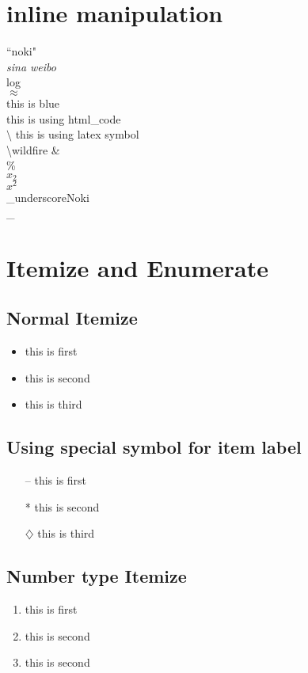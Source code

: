 \documentclass{article}
\author{Sab}
\begin{document}
\section{inline manipulation}
``noki"\\
\emph{sina weibo}\\
\mbox{log}\\
$\approx$\\
{\color{blue}this is blue}\\
{\color[HTML]{8e1a00}this is using html\_code}\\
$\setminus$ this is using latex symbol\\
\textbackslash{wildfire}
\&\\
\%\\
$x_{2}$\\
$x^{2}$\\
\_underscoreNoki\\
\_\\

\section{Itemize and Enumerate}
\label{ref:Itemize}
\subsection{Normal Itemize}
\begin{itemize}
\item this is first
\item this is second
\item this is third
\end{itemize}

\subsection{Using special symbol for item label}
\begin{itemize}
\item[--]this is first
\item[*]this is second
\item[$\diamondsuit$]this is third
\end{itemize}

\subsection{Number type Itemize}
\begin{enumerate}
\item this is first
\item this is second
\item this is second
\end{enumerate}
\end{document}
